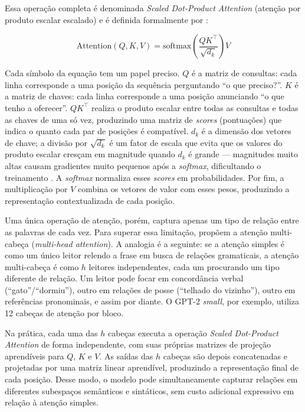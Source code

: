 Essa operação completa é denominada \textit{Scaled Dot-Product Attention} (atenção por
produto escalar escalado) e é definida formalmente por \cite{Vaswani2017}:

\[
    \text{Attention}(Q, K, V) = \text{softmax}\!\left(\frac{QK^\top}{\sqrt{d_k}}\right) V
\]

Cada símbolo da equação tem um papel preciso. $Q$ é a matriz de consultas: cada linha
corresponde a uma posição da sequência perguntando ``o que preciso?''. $K$ é a matriz
de chaves: cada linha corresponde a uma posição anunciando ``o que tenho a oferecer''.
$QK^\top$ realiza o produto escalar entre todas as consultas e todas as chaves de uma só
vez, produzindo uma matriz de \textit{scores} (pontuações) que indica o quanto cada par de
posições é compatível. $d_k$ é a dimensão dos vetores de chave; a divisão por $\sqrt{d_k}$
é um fator de escala que evita que os valores do produto escalar cresçam em magnitude
quando $d_k$ é grande --- magnitudes muito altas causam gradientes muito pequenos após a
\textit{softmax}, dificultando o treinamento \cite{Vaswani2017}. A \textit{softmax}
normaliza esses \textit{scores} em probabilidades. Por fim, a multiplicação por $V$
combina os vetores de valor com esses pesos, produzindo a representação contextualizada
de cada posição.

Uma única operação de atenção, porém, captura apenas um tipo de relação entre as palavras
de cada vez. Para superar essa limitação,  propõem a atenção
multi-cabeça (\textit{multi-head attention}). A analogia é a seguinte: se a atenção
simples é como um único leitor relendo a frase em busca de relações gramaticais, a atenção
multi-cabeça é como $h$ leitores independentes, cada um procurando um tipo diferente de
relação. Um leitor pode focar em concordância verbal (``gato''/``dormiu''), outro em
relações de posse (``telhado do vizinho''), outro em referências pronominais, e assim por
diante. O GPT-2 \textit{small}, por exemplo, utiliza 12 cabeças de atenção por bloco.

Na prática, cada uma das $h$ cabeças executa a operação \textit{Scaled Dot-Product
Attention} de forma independente, com suas próprias matrizes de projeção aprendíveis para
$Q$, $K$ e $V$. As saídas das $h$ cabeças são depois concatenadas e projetadas por uma
matriz linear aprendível, produzindo a representação final de cada posição. Desse modo,
o modelo pode simultaneamente capturar relações em diferentes subespaços semânticos e
sintáticos, sem custo adicional expressivo em relação à atenção simples.

